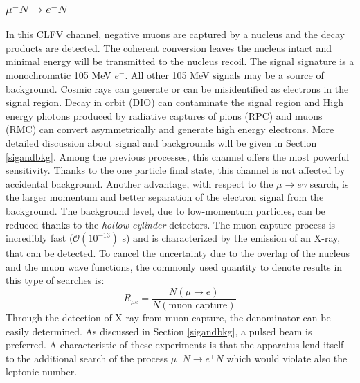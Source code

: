 \subsubsection{$\mu^- N \rightarrow e^- N $}
In this CLFV channel, negative muons are captured by a nucleus and the decay products are detected. The coherent conversion leaves the nucleus
intact and minimal energy will be transmitted to the nucleus recoil.
The signal signature is a monochromatic 105 MeV $e^-$. All other 105 MeV signals may be a source of background. 
Cosmic rays can generate or can be misidentified as electrons in the signal region.
Decay in orbit (DIO) can contaminate the signal region and High energy photons produced by radiative captures of pions (RPC) and muons (RMC) can convert 
asymmetrically and generate high energy electrons. More detailed discussion about signal and backgrounds will be given in Section \ref{sigandbkg}.
Among the previous processes, this channel offers the most powerful sensitivity. 
Thanks to the one particle final state, this channel is not affected by accidental background.
Another advantage, with respect to the $\mu \rightarrow e \gamma$ search, is the larger momentum
and better separation of the electron signal from the background. The background level, due to low-momentum particles, can be reduced
thanks to the \textit{hollow-cylinder} detectors. The muon capture process is incredibly fast ($\mathcal{O}(10^{-13})$ s) and is characterized by the emission of
an X-ray, that can be detected. To cancel the uncertainty due to the overlap of the nucleus and the muon wave
functions, the commonly used quantity to denote results in this type of searches is:
\begin{equation}
    R_{\mu e}=\frac{N(\mu \rightarrow e)}{N(\text{muon capture})}
\end{equation}
Through the detection of X-ray from muon capture, the denominator can be easily determined.
As discussed in Section \ref{sigandbkg}, a pulsed beam is preferred.
A characteristic of these experiments is that the apparatus lend itself to the additional
search of the process $\mu^- N \rightarrow e^+ N$ which would violate also the leptonic number.
